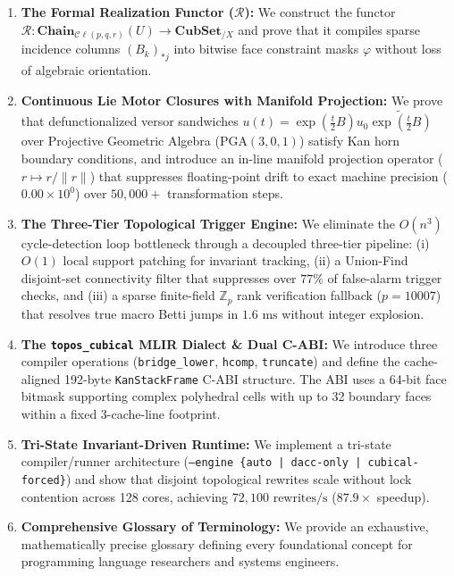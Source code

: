 \documentclass[acmsmall,screen,nonacm]{acmart}
\newcommand{\Cl}{\mathcal{C}\ell}
\newcommand{\PGA}{\mathrm{PGA}(3,0,1)}
\newcommand{\Chain}{\mathbf{Chain}}
\newcommand{\CubSet}{\mathbf{CubSet}}
\newcommand{\Real}{\mathcal{R}}
\newcommand{\KSF}{\texttt{KanStackFrame}}
\begin{document}
\begin{enumerate}
    \item \textbf{The Formal Realization Functor ($\Real$):} We construct the functor $\Real : \Chain_{\Cl(p,q,r)}(U) \to \CubSet_{/X}$ and prove that it compiles sparse incidence columns $(B_k)_{*j}$ into bitwise face constraint masks $\varphi$ without loss of algebraic orientation.
    \item \textbf{Continuous Lie Motor Closures with Manifold Projection:} We prove that defunctionalized versor sandwiches $u(t) = \exp(\tfrac{t}{2}B) u_0 \widetilde{\exp(\tfrac{t}{2}B)}$ over Projective Geometric Algebra ($\PGA$) satisfy Kan horn boundary conditions, and introduce an in-line manifold projection operator ($r \mapsto r / \|r\|$) that suppresses floating-point drift to exact machine precision ($0.00 \times 10^0$) over $50{,}000+$ transformation steps.
    \item \textbf{The Three-Tier Topological Trigger Engine:} We eliminate the $O(n^3)$ cycle-detection loop bottleneck through a decoupled three-tier pipeline: (i) $O(1)$ local support patching for invariant tracking, (ii) a Union-Find disjoint-set connectivity filter that suppresses over $77\%$ of false-alarm trigger checks, and (iii) a sparse finite-field $\mathbb{Z}_p$ rank verification fallback ($p = 10007$) that resolves true macro Betti jumps in $1.6\text{ ms}$ without integer explosion.
    \item \textbf{The \texttt{topos\_cubical} MLIR Dialect \& Dual C-ABI:} We introduce three compiler operations (\texttt{bridge\_lower}, \texttt{hcomp}, \texttt{truncate}) and define the cache-aligned 192-byte \KSF{} C-ABI structure. The ABI uses a 64-bit face bitmask supporting complex polyhedral cells with up to 32 boundary faces within a fixed 3-cache-line footprint.
    \item \textbf{Tri-State Invariant-Driven Runtime:} We implement a tri-state compiler/runner architecture (\texttt{--engine \{auto | dacc-only | cubical-forced\}}) and show that disjoint topological rewrites scale without lock contention across 128 cores, achieving $72{,}100\text{ rewrites/s}$ ($87.9\times$ speedup).
    \item \textbf{Comprehensive Glossary of Terminology:} We provide an exhaustive, mathematically precise glossary defining every foundational concept for programming language researchers and systems engineers.
\end{enumerate}

\end{document}
